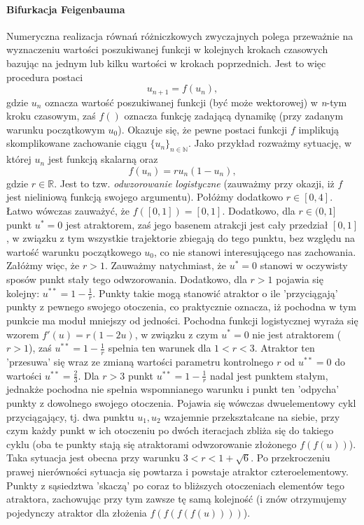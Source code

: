 \documentclass[12pt, twoside]{book}
\begin{document}
\paragraph{Bifurkacja Feigenbauma}
Numeryczna realizacja równań różniczkowych zwyczajnych polega przeważnie na wyznaczeniu wartości poszukiwanej funkcji w kolejnych krokach czasowych bazując na jednym lub kilku wartości w krokach poprzednich. Jest to więc procedura postaci
\begin{equation}
\label{discrete_dyn_eq}
u_{n+1} = f(u_{n}),
\end{equation}
gdzie $ u_{n} $ oznacza wartość poszukiwanej funkcji (być może wektorowej) w \textit{n}-tym kroku czasowym, zaś $ f() $ oznacza funkcję zadającą dynamikę (przy zadanym warunku początkowym $ u_{0} $). Okazuje się, że pewne postaci funkcji $ f $ implikują skomplikowane zachowanie ciągu $ \{u_{n}\}_{n\in \mathbb{N}} $. Jako przykład rozważmy sytuację, w której $ u_{n} $ jest funkcją skalarną oraz 
\begin{equation} 
f(u_{n}) = ru_{n}(1-u_{n}),
\end{equation}
gdzie $ r \in \mathbb{R} $. Jest to tzw. \textit{odwzorowanie logistyczne} (zauważmy przy okazji, iż $ f $ jest nieliniową funkcją swojego argumentu). Połóżmy dodatkowo $ r \in [0,4] $. Łatwo wówczas zauważyć, że $ f([0,1]) = [0,1] $. Dodatkowo, dla $ r\in (0,1] $ punkt $ u^{*} = 0 $ jest atraktorem, zaś jego basenem atrakcji jest cały przedział $ [0,1] $, w związku z tym wszystkie trajektorie zbiegają do tego punktu, bez względu na wartość warunku początkowego $ u_{0} $, co nie stanowi interesującego nas zachowania. Załóżmy więc, że $ r>1 $. Zauważmy natychmiast, że $ u^{*} = 0 $ stanowi w oczywisty sposów punkt stały tego odwzorowania. Dodatkowo, dla $ r>1 $ pojawia się kolejny: $ u^{**} = 1-\frac{1}{r} $. Punkty takie mogą stanowić atraktor o ile 'przyciągają' punkty z pewnego swojego otoczenia, co praktycznie oznacza, iż pochodna w tym punkcie ma moduł mniejszy od jedności. Pochodna funkcji logistycznej wyraża się wzorem $ f'(u) = r(1-2u) $, w związku z czym $ u^{*} = 0 $ nie jest atraktorem ($ r>1 $), zaś $ u^{**} = 1-\frac{1}{r} $ spełnia ten warunek dla $ 1<r<3 $. Atraktor ten 'przesuwa' się wraz ze zmianą wartości parametru kontrolnego $ r $ od $ u^{**} = 0 $ do wartości $ u^{**} = \frac{2}{3} $. \newline
Dla  $ r>3 $ punkt $ u^{**} = 1-\frac{1}{r} $ nadal jest punktem stałym, jednakże pochodna nie spełnia wspomnianego warunku i punkt ten 'odpycha' punkty z dowolnego swojego otoczenia. Pojawia się wówczas dwuelementowy cykl przyciągający, tj. dwa punktu $ u_{1}, u_{2} $ wzajemnie przekształcane na siebie, przy czym każdy punkt w ich otoczeniu po dwóch iteracjach zbliża się do takiego cyklu (oba te punkty stają się atraktorami odwzorowanie złożonego $ f(f(u)) $). Taka sytuacja jest obecna przy warunku $ 3<r<1+\sqrt{6} $. Po przekroczeniu prawej nierówności sytuacja się powtarza i powstaje atraktor czteroelementowy. Punkty z sąsiedztwa 'skaczą' po coraz to bliższych otoczeniach elementów tego atraktora, zachowując przy tym zawsze tę samą kolejność (i znów otrzymujemy pojedynczy atraktor dla złożenia $ f(f(f(f(u)))) $).\newline
\end{document}
